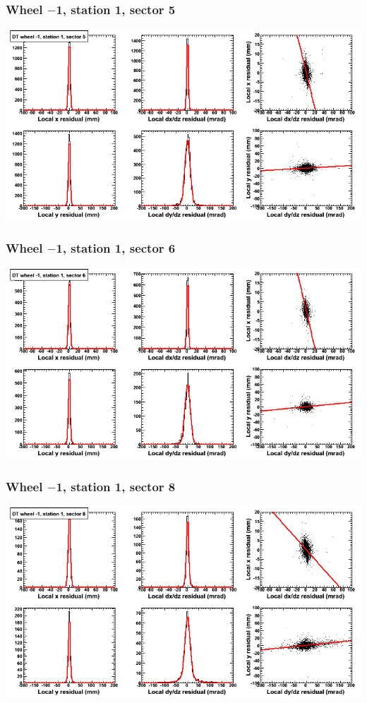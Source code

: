 \documentclass[compress]{beamer}
\begin{document}
\begin{frame}
\frametitle{Wheel $-$1, station 1, sector 5}
\includegraphics[width=\linewidth]{tmpbell_MBwhBst1sec05.png}
\end{frame}

\begin{frame}
\frametitle{Wheel $-$1, station 1, sector 6}
\includegraphics[width=\linewidth]{tmpbell_MBwhBst1sec06.png}
\end{frame}

\begin{frame}
\frametitle{Wheel $-$1, station 1, sector 8}
\includegraphics[width=\linewidth]{tmpbell_MBwhBst1sec08.png}
\end{frame}
\end{document}
